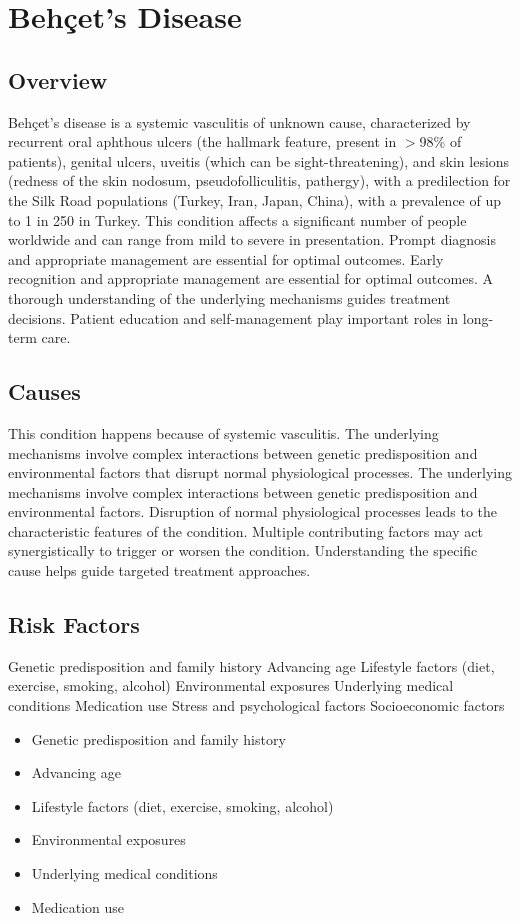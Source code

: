 \chapter{Behçet's Disease}
\label{sec:Behçet's Disease}

\section{Overview}
Behçet's disease is a systemic vasculitis of unknown cause, characterized by recurrent oral aphthous ulcers (the hallmark feature, present in $>$98\% of patients), genital ulcers, uveitis (which can be sight-threatening), and skin lesions (redness of the skin nodosum, pseudofolliculitis, pathergy), with a predilection for the Silk Road populations (Turkey, Iran, Japan, China), with a prevalence of up to 1 in 250 in Turkey. This condition affects a significant number of people worldwide and can range from mild to severe in presentation. Prompt diagnosis and appropriate management are essential for optimal outcomes. Early recognition and appropriate management are essential for optimal outcomes. A thorough understanding of the underlying mechanisms guides treatment decisions. Patient education and self-management play important roles in long-term care.
\section{Causes}
This condition happens because of systemic vasculitis. The underlying mechanisms involve complex interactions between genetic predisposition and environmental factors that disrupt normal physiological processes. The underlying mechanisms involve complex interactions between genetic predisposition and environmental factors. Disruption of normal physiological processes leads to the characteristic features of the condition. Multiple contributing factors may act synergistically to trigger or worsen the condition. Understanding the specific cause helps guide targeted treatment approaches.
\section{Risk Factors}
Genetic predisposition and family history Advancing age Lifestyle factors (diet, exercise, smoking, alcohol) Environmental exposures Underlying medical conditions Medication use Stress and psychological factors Socioeconomic factors

\begin{itemize}[noitemsep]
  \item Genetic predisposition and family history
  \item Advancing age
  \item Lifestyle factors (diet, exercise, smoking, alcohol)
  \item Environmental exposures
  \item Underlying medical conditions
  \item Medication use
\end{itemize}
